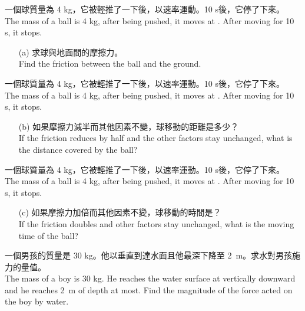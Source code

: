\documentclass[beamer=true]{standalone}
\begin{document}
\begin{eg}
    一個球質量為 4 kg，它被輕推了一下後，以速率運動。10 s後，它停了下來。 \\The mass of a ball is 4 kg, after being pushed, it moves at . After moving for 10 s, it stops.
    \begin{itemize}
        \item[(a)] 求球與地面間的摩擦力。 \\Find the friction between the ball and the ground.
    \end{itemize}
\end{eg}
\begin{eg}
    一個球質量為 4 kg，它被輕推了一下後，以速率運動。10 s後，它停了下來。 \\The mass of a ball is 4 kg, after being pushed, it moves at . After moving for 10 s, it stops.
    \begin{itemize}
        \item[(b)] 如果摩擦力減半而其他因素不變，球移動的距離是多少？ \\If the friction reduces by half and the other factors stay unchanged, what is the distance covered by the ball?
    \end{itemize}
\end{eg}
\begin{eg}
    一個球質量為 4 kg，它被輕推了一下後，以速率運動。10 s後，它停了下來。 \\The mass of a ball is 4 kg, after being pushed, it moves at . After moving for 10 s, it stops.
    \begin{itemize}
        \item[(c)] 如果摩擦力加倍而其他因素不變，球移動的時間是？ \\If the friction doubles and other factors stay unchanged, what is the moving time of the ball?
    \end{itemize}
\end{eg}


\begin{eg}
    一個男孩的質量是 30 kg。他以垂直到達水面且他最深下降至 \qty{2}{m}。求水對男孩施力的量值。\\ The mass of a boy is 30 kg. He reaches the water surface at  vertically downward and he reaches \qty{2}{m} of depth at most. Find the magnitude of the force acted on the boy by water.
\end{eg}
\end{document}
